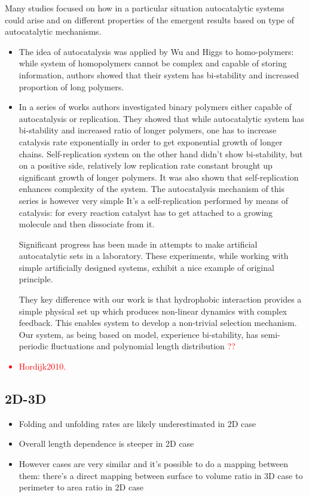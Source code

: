 \documentclass[journal=jacsat,manuscript=article,layout=twocolumn]{achemso}
\newcommand*{\red}[1]{\textcolor{red}{#1}}
\begin{document}
Many studies focused on how in a particular situation autocatalytic systems could arise and on 
different properties of the emergent results based on type of autocatalytic mechanisms.
\begin{itemize}
\item The idea of 
autocatalysis was applied by Wu and Higgs\cite{Wu2009} to homo-polymers: while system of 
homopolymers cannot be 
complex and capable of storing information, authors showed that their system has bi-stability and 
increased proportion of long polymers.
 \item In a series of works \cite{nowak2008prevolutionary,Ohtsuki2009,Chen2012,Derr2012} 
 authors investigated binary polymers 
either capable of autocatalysis or replication. They showed that while autocatalytic system has 
bi-stability and increased ratio of longer polymers, one has to increase catalysis rate 
exponentially in order to get exponential growth of longer chains. Self-replication system on the 
other hand didn't show bi-stability, but on a positive side, relatively low replication rate 
constant brought up significant growth of longer polymers. It was also shown that self-replication 
enhances complexity of the system. The autocatalysis mechanism of this series is however very 
simple It's a self-replication performed by means of catalysis: for every reaction catalyst has to 
get attached to a growing molecule and then dissociate from it.


Significant progress has been made in attempts to make artificial autocatalytic sets in a 
laboratory\cite{VonKiedrowski1986,Lincoln2009,Vaidya2012}. These experiments, while working with 
simple artificially designed systems, exhibit a nice example of original principle.


They key difference with our work is 
that hydrophobic interaction provides a simple physical set up which produces non-linear dynamics 
with complex feedback.
This enables system to develop a non-trivial selection mechanism. Our system, as being based on 
\cite{Ohtsuki2009} model, experience bi-stability, has semi-periodic fluctuations  
and polynomial length distribution \red{??} 
\end{itemize}

\red{
\begin{itemize}
 \item Hordijk2010.
\end{itemize}
}


\subsection{2D-3D}
\begin{itemize}
 \item Folding and unfolding rates are likely underestimated in 2D case
 \item Overall length dependence is steeper in 2D case
 \item However cases are very similar and it's possible to do a mapping between them: there's a 
direct mapping between surface to volume ratio in 3D case to perimeter to area ratio in 2D case
\end{itemize}
\end{document}
